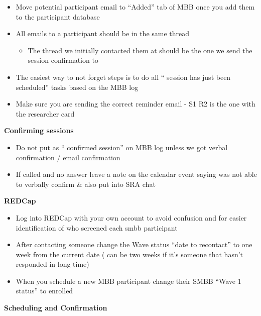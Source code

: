 \documentclass[]{book}
\providecommand{\tightlist}{%
  \setlength{\itemsep}{0pt}\setlength{\parskip}{0pt}}
\begin{document}
\begin{itemize}
\tightlist
\item
  Move potential participant email to ``Added'' tab of MBB once you add them to the participant database
\item
  All emails to a participant should be in the same thread

  \begin{itemize}
  \tightlist
  \item
    The thread we initially contacted them at should be the one we send the session confirmation to
  \end{itemize}
\item
  The easiest way to not forget steps is to do all `` session has just been scheduled'' tasks based on the MBB log
\item
  Make sure you are sending the correct reminder email - S1 R2 is the one with the researcher card
\end{itemize}

\textbf{Confirming sessions}

\begin{itemize}
\tightlist
\item
  Do not put as `` confirmed session'' on MBB log unless we got verbal confirmation / email confirmation
\item
  If called and no answer leave a note on the calendar event saying was not able to verbally confirm \& also put into SRA chat
\end{itemize}

\textbf{REDCap}

\begin{itemize}
\tightlist
\item
  Log into REDCap with your own account to avoid confusion and for easier identification of who screened each smbb participant
\item
  After contacting someone change the Wave status ``date to recontact'' to one week from the current date ( can be two weeks if it's someone that hasn't responded in long time)
\item
  When you schedule a new MBB participant change their SMBB ``Wave 1 status'' to enrolled
\end{itemize}

\textbf{Scheduling and Confirmation}
\end{document}
